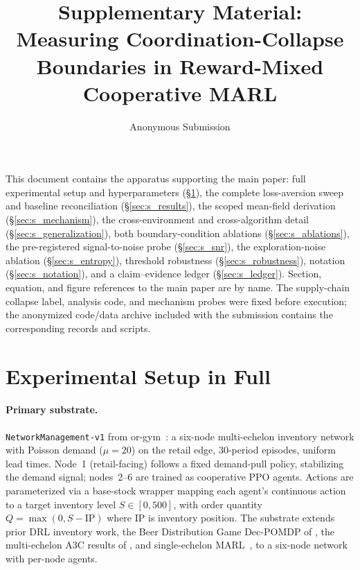 \documentclass[letterpaper]{article} %
\title{Supplementary Material:\\Measuring Coordination-Collapse Boundaries in Reward-Mixed Cooperative MARL}
\author{
  Anonymous Submission
}
\theoremstyle{plain}
\begin{document}
\maketitle

\noindent This document contains the apparatus supporting the main paper: full experimental
setup and hyperparameters (\S\ref{sec:s_setup}), the complete loss-aversion sweep and
baseline reconciliation (\S\ref{sec:s_results}), the scoped mean-field derivation
(\S\ref{sec:s_mechanism}), the cross-environment and cross-algorithm detail
(\S\ref{sec:s_generalization}), both boundary-condition ablations (\S\ref{sec:s_ablations}),
the pre-registered signal-to-noise probe (\S\ref{sec:s_snr}), the exploration-noise ablation
(\S\ref{sec:s_entropy}), threshold robustness (\S\ref{sec:s_robustness}), notation
(\S\ref{sec:s_notation}), and a claim--evidence ledger (\S\ref{sec:s_ledger}). Section,
equation, and figure references to the main paper are by name. The supply-chain collapse label,
analysis code, and mechanism probes were fixed before execution; the anonymized code/data archive
included with the submission contains the corresponding records and scripts.

\section{Experimental Setup in Full}
\label{sec:s_setup}

\paragraph{Primary substrate.}
\texttt{NetworkManagement-v1} from or-gym~\citep{hubbs2020orgym}: a six-node multi-echelon
inventory network with Poisson demand ($\mu{=}20$) on the retail edge, 30-period episodes,
uniform lead times. Node~1 (retail-facing) follows a fixed demand-pull policy, stabilizing
the demand signal; nodes~2--6 are trained as cooperative PPO agents. Actions are
parameterized via a base-stock wrapper mapping each agent's continuous action to a target
inventory level $S\in[0,500]$, with order quantity $Q=\max(0,S-\mathrm{IP})$ where
$\mathrm{IP}$ is inventory position. The substrate extends prior DRL inventory work, the
Beer Distribution Game Dec-POMDP of \citet{oroojlooyjadid2022}, the multi-echelon A3C results
of \citet{gijsbrechts2022}, and single-echelon MARL~\citep{marlim2023}, to a six-node
network with per-node agents.
\end{document}
